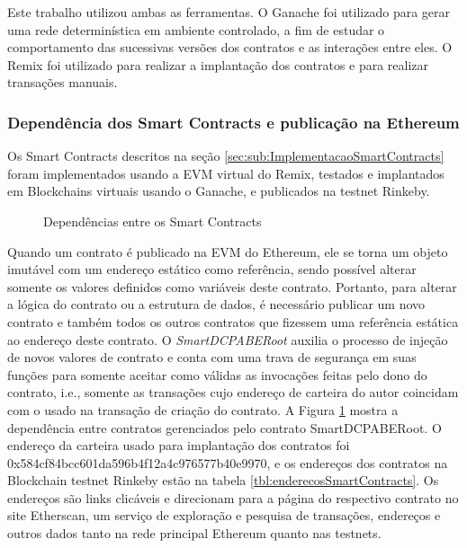 \documentclass[a4paper,11pt]{article}
\begin{document}
Este trabalho utilizou ambas as ferramentas.
O Ganache foi utilizado para gerar uma rede determinística em ambiente controlado, a fim de estudar o comportamento das sucessivas versões dos contratos e as interações entre eles.
O Remix foi utilizado para realizar a implantação dos contratos e para realizar transações manuais.

\subsubsection{Dependência dos Smart Contracts e publicação na Ethereum}


Os Smart Contracts descritos na seção \ref{sec:sub:ImplementacaoSmartContracts} foram implementados usando a EVM virtual do Remix, testados e implantados em Blockchains virtuais usando o Ganache, e  publicados na testnet Rinkeby.

\begin{figure}[!h]
  \centering
  
  \caption{Dependências entre os Smart Contracts}
  \label{fig:dependenciasSmartContracts}
\end{figure}

Quando um contrato é publicado na EVM do Ethereum, ele se torna um objeto imutável {\color{blue}com um endereço  estático como referência}, sendo possível alterar somente os valores definidos como variáveis deste contrato.
Portanto, para alterar a lógica do contrato ou a estrutura de dados, é necessário publicar um novo contrato e também todos os outros contratos que fizessem uma referência estática ao endereço deste contrato.
O \emph{SmartDCPABERoot} auxilia o processo de injeção de novos valores de contrato e conta com uma trava de segurança em suas funções para somente aceitar como válidas as invocações feitas pelo dono do contrato, i.e., somente as transações cujo  endereço de carteira do autor coincidam com o usado na transação de criação do contrato.
A Figura \ref{fig:dependenciasSmartContracts} mostra a dependência entre contratos gerenciados pelo contrato SmartDCPABERoot. %
O endereço da carteira usado para implantação dos contratos foi 0x584cf84bcc601da596b4f12a4c976577b40e9970, e os endereços dos contratos na Blockchain testnet Rinkeby estão na tabela \ref{tbl:enderecosSmartContracts}.
Os endereços são links clicáveis e direcionam para a página do respectivo contrato no site Etherscan, um serviço de exploração e pesquisa de transações, endereços e outros dados tanto na rede principal Ethereum quanto nas testnets.
\end{document}
